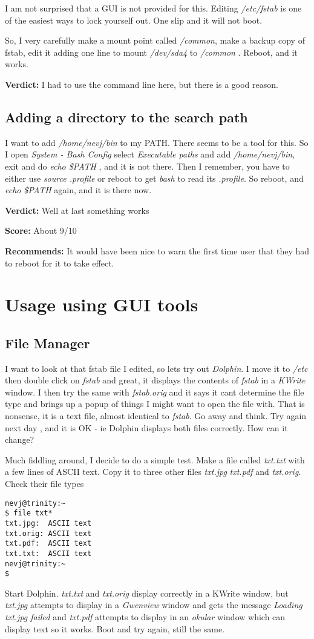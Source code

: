 \documentclass{article}  %
\begin{document}
I am not surprised that a GUI is not provided for this. Editing {\em /etc/fstab}  is one of the easiest ways to lock yourself out. One slip and it will not boot. 

So, I very carefully make a mount point called {\em /common}, make a backup copy of fstab, edit it adding one line to mount {\em /dev/sda4} to {\em /common} . Reboot, and it works. 

{\bf Verdict:} I had to use the command line here, but there is a good reason.

\subsection{Adding a directory to the search path}
I want to add {\em /home/nevj/bin} to my PATH. There seems to be a tool for this. So I open {\em System - Bash Config} select {\em Executable paths} and add {\em /home/nevj/bin}, exit and do {\em echo \$PATH} , and it is not there. 
Then I remember, you have to either use {\em source .profile} or reboot to get {\em bash} to read its {\em .profile}. So reboot, and {\em echo \$PATH} again, and it is there now. 

{\bf Verdict:} Well at last something works

{\bf Score:} About 9/10

{\bf Recommends:} It would have been nice to warn the first time user that they had to reboot for it to take effect.

\section{Usage using GUI tools}
\label{sec:usage}

\subsection{File Manager}
I want to look at that fstab file I edited, so lets try out {\em Dolphin}. I move it to {\em /etc} then double click on {\em fstab} and great, it displays the contents of {\em fstab} in a {\em KWrite} window. I then try the same with {\em fstab.orig} and it says it cant determine the file type and brings up a popup of things I might want to open the file with. That is nonsense, it is a text file, almost identical to {\em fstab}.  Go away and think. Try again next day , and it is OK - ie Dolphin displays both files correctly. How can it change?

Much fiddling around, I decide to do a simple test. Make a file called {\em txt.txt} with a few lines of ASCII text. Copy it to three other files {\em txt.jpg} {\em txt.pdf} and {\em txt.orig}. Check their file types
\begin{verbatim}
nevj@trinity:~
$ file txt*
txt.jpg:  ASCII text
txt.orig: ASCII text
txt.pdf:  ASCII text
txt.txt:  ASCII text
nevj@trinity:~
$ 
\end{verbatim}
Start Dolphin. {\em txt.txt} and {\em txt.orig} display correctly in a KWrite window, but {\em txt.jpg} attempts to display in a {\em Gwenview} window and gets the message {\em Loading txt.jpg failed} and {\em txt.pdf} attempts to display in an {\em okular} window which can display text so it works. Boot and try again, still the same.
\end{document}

